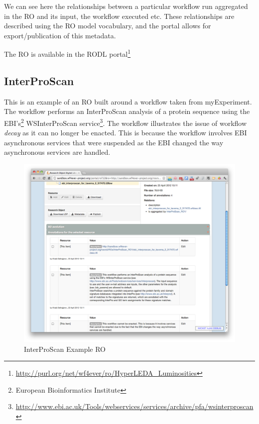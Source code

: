 We can see here the relationships between a particular workflow run
aggregated in the RO and its input, the workflow executed etc. These
relationships are described using the RO model vocabulary, and the
portal allows for export/publication of this metadata. 

The RO is available in the RODL
portal\footnote{\url{http://purl.org/net/wf4ever/ro/HyperLEDA_Luminosities}}

\subsection{InterProScan}
\label{subsec:interproscan}

This is an example of an RO built around a workflow taken from
myExperiment. The workflow performs an InterProScan analysis of a
protein sequence using the EBI's\footnote{European Bioinformatics Institute} WSInterProScan service\footnote{\url{http://www.ebi.ac.uk/Tools/webservices/services/archive/pfa/wsinterproscan}}. The
workflow illustrates the issue of workflow \emph{decay} as it can no
longer be enacted. This is because the workflow involves EBI
asynchronous services that were suspended as the EBI changed the way
asynchronous services are handled. 

\begin{figure}[h]
  \centering
  \includegraphics[width=\picwidth]{Figures/interpro}
  \caption{InterProScan Example RO}
  \label{fig:interpro}
\end{figure}

